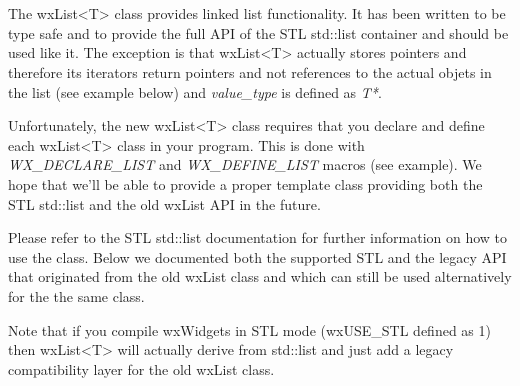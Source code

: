 
\section{}\label{wxlist}

The wxList<T> class provides linked list functionality. It has been written
to be type safe and to provide the full API of the STL std::list container and
should be used like it. The exception is that wxList<T> actually stores
pointers and therefore its iterators return pointers and not references
to the actual objets in the list (see example below) and {\it value\_type} 
is defined as {\it T*}.


Unfortunately, the
new wxList<T> class requires that you declare and define each wxList<T>
class in your program. This is done with {\it WX\_DECLARE\_LIST} and 
{\it WX\_DEFINE\_LIST} macros (see example). We hope that we'll be able
to provide a proper template class providing both the STL std::list
and the old wxList API in the future.

Please refer to the STL std::list documentation for further
information on how to use the class. Below we documented both
the supported STL and the legacy API that originated from the 
old wxList class and which can still be used alternatively for
the the same class.

Note that if you compile wxWidgets in STL mode (wxUSE\_STL defined as 1) 
then wxList<T> will actually derive from std::list and just add a legacy 
compatibility layer for the old wxList class.


